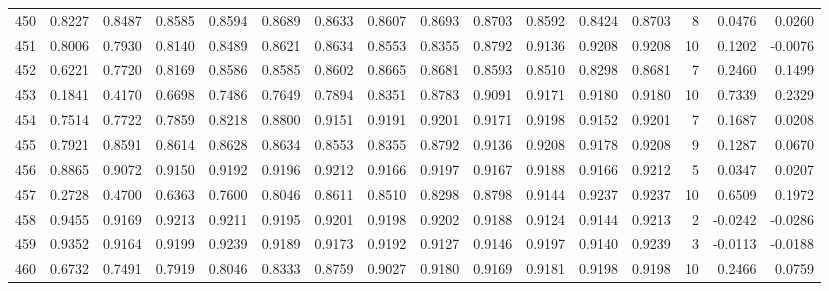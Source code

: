 \begin{tabular}{lrrrrrrrrrrrrrrr}
450 &      0.8227 &  0.8487 &  0.8585 &  0.8594 &  0.8689 &  0.8633 &  0.8607 &  0.8693 &  0.8703 &  0.8592 &   0.8424 &     0.8703 &      8 &                    0.0476 &                     0.0260 \\
451 &      0.8006 &  0.7930 &  0.8140 &  0.8489 &  0.8621 &  0.8634 &  0.8553 &  0.8355 &  0.8792 &  0.9136 &   0.9208 &     0.9208 &     10 &                    0.1202 &                    -0.0076 \\
452 &      0.6221 &  0.7720 &  0.8169 &  0.8586 &  0.8585 &  0.8602 &  0.8665 &  0.8681 &  0.8593 &  0.8510 &   0.8298 &     0.8681 &      7 &                    0.2460 &                     0.1499 \\
453 &      0.1841 &  0.4170 &  0.6698 &  0.7486 &  0.7649 &  0.7894 &  0.8351 &  0.8783 &  0.9091 &  0.9171 &   0.9180 &     0.9180 &     10 &                    0.7339 &                     0.2329 \\
454 &      0.7514 &  0.7722 &  0.7859 &  0.8218 &  0.8800 &  0.9151 &  0.9191 &  0.9201 &  0.9171 &  0.9198 &   0.9152 &     0.9201 &      7 &                    0.1687 &                     0.0208 \\
455 &      0.7921 &  0.8591 &  0.8614 &  0.8628 &  0.8634 &  0.8553 &  0.8355 &  0.8792 &  0.9136 &  0.9208 &   0.9178 &     0.9208 &      9 &                    0.1287 &                     0.0670 \\
456 &      0.8865 &  0.9072 &  0.9150 &  0.9192 &  0.9196 &  0.9212 &  0.9166 &  0.9197 &  0.9167 &  0.9188 &   0.9166 &     0.9212 &      5 &                    0.0347 &                     0.0207 \\
457 &      0.2728 &  0.4700 &  0.6363 &  0.7600 &  0.8046 &  0.8611 &  0.8510 &  0.8298 &  0.8798 &  0.9144 &   0.9237 &     0.9237 &     10 &                    0.6509 &                     0.1972 \\
458 &      0.9455 &  0.9169 &  0.9213 &  0.9211 &  0.9195 &  0.9201 &  0.9198 &  0.9202 &  0.9188 &  0.9124 &   0.9144 &     0.9213 &      2 &                   -0.0242 &                    -0.0286 \\
459 &      0.9352 &  0.9164 &  0.9199 &  0.9239 &  0.9189 &  0.9173 &  0.9192 &  0.9127 &  0.9146 &  0.9197 &   0.9140 &     0.9239 &      3 &                   -0.0113 &                    -0.0188 \\
460 &      0.6732 &  0.7491 &  0.7919 &  0.8046 &  0.8333 &  0.8759 &  0.9027 &  0.9180 &  0.9169 &  0.9181 &   0.9198 &     0.9198 &     10 &                    0.2466 &                     0.0759 \\

\end{tabular}
